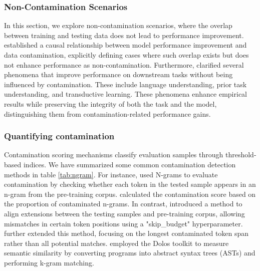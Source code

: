 \subsubsection{Non-Contamination Scenarios}
In this section, we explore non-contamination scenarios, where the overlap between training and testing data does not lead to performance improvement. \citet{dekoninck2024constat} established a causal relationship between model performance improvement and data contamination, explicitly defining cases where such overlap exists but does not enhance performance as non-contamination. Furthermore, \citet{palavalli-etal-2024-taxonomy} clarified several phenomena that improve performance on downstream tasks without being influenced by contamination. These include language understanding, prior task understanding, and transductive learning. These phenomena enhance empirical results while preserving the integrity of both the task and the model, distinguishing them from contamination-related performance gains.

\subsubsection{Quantifying contamination}
\label{chap:quantifying}
Contamination scoring mechanisms classify evaluation samples through threshold-based indices. We have summarized some common contamination detection methods in table \ref{tab:ngram}. For instance, \citet{brown2020language} used N-grams to evaluate contamination by checking whether each token in the tested sample appears in an n-gram from the pre-training corpus. \citet{chowdhery2023palm} calculated the contamination score based on the proportion of contaminated n-grams. In contrast, \citet{touvron2023llama2} introduced a method to align extensions between the testing samples and pre-training corpus, allowing mismatches in certain token positions using a "skip\_budget" hyperparameter. \citet{singh2024evaluation} further extended this method, focusing on the longest contaminated token span rather than all potential matches. \citet{riddell2024quantifyingcontaminationevaluatingcode} employed the Dolos toolkit \cite{maertens2022dolos} to measure semantic similarity by converting programs into abstract syntax trees (ASTs) and performing k-gram matching.




